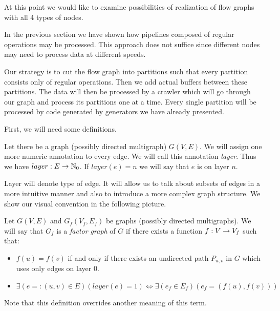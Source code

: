 At this point we would like to examine possibilities of realization of flow graphs with all 4 types of nodes. 

\parspace

In the previous section we have shown how pipelines composed of regular operations may be processed. This approach does not suffice since different nodes may need to process data at different speeds. 

\parspace

\FloatBarrier

Our strategy is to cut the flow graph into partitions such that every partition consists only of regular operations. Then we add actual buffers between these partitions. The data will then be processed by a crawler which will go through our graph and process its partitions one at a time. Every single partition will be processed by code generated by generators we have already presented. 

\parspace

First, we will need some definitions.

\begin{define}
Let there be a graph (possibly directed multigraph) $G(V,E)$. We will assign one more numeric annotation to every edge. We will call this annotation \emph{layer}. Thus we have $layer: E \rightarrow \mathbb{N}_0$. If $layer(e) = n$ we will say that $e$ is on layer $n$.
\end{define}

Layer will denote type of edge. It will allow us to talk about subsets of edges in a more intuitive manner and also to introduce a more complex graph structure. We show our visual convention in the following picture.


\begin{define}
  Let $G(V,E)$ and $G_f(V_f,E_f)$ be graphs (possibly directed multigraphs). We will say that $G_f$ is a \emph{factor graph} of $G$ if there exists a function $f: V \rightarrow V_f$ such that:
\begin{itemize}
  \item $f(u) = f(v)$ if and only if there exists an undirected path $P_{u,v}$  in $G$ which uses only edges on layer 0. 
  \item $\exists(e =: (u,v) \in E)(layer(e) = 1) \Longleftrightarrow \exists(e_f \in E_f)( e_f = (f(u), f(v)) )$
\end{itemize}
\end{define}

Note that this definition overrides another meaning of this term.




